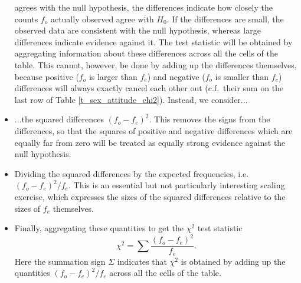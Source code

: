 \begin{itemize}
agrees with the null hypothesis, the differences indicate how closely
the counts $f_{o}$ actually observed agree with $H_{0}$. If the
differences are small, the observed data are consistent with the null
hypothesis, whereas large differences indicate evidence against it.
The test statistic will be obtained by aggregating information about these
differences across all the cells of the table. This cannot, however, be
done by adding up the differences themselves, because positive
($f_{o}$ is larger than $f_{e}$)
and negative
($f_{o}$ is smaller than $f_{e}$) differences
will always exactly cancel each other
out (c.f.\ their sum on the last row of Table \ref{t_sex_attitude_chi2}). Instead, we
consider...
\item
...the squared differences $(f_{o}-f_{e})^{2}$. This
removes the signs from the differences, so that the squares of
positive and negative differences which are equally far from zero will
be treated as equally strong evidence against the null hypothesis.
\item
Dividing the squared differences by the expected frequencies, i.e.\
$(f_{o}-f_{e})^{2}/f_{e}$. This is an essential but not particularly
interesting scaling exercise, which expresses the sizes of the squared
differences relative to the sizes of $f_{e}$ themselves.
\item
Finally, aggregating these quantities
to get the $\chi^{2}$ test statistic
\begin{equation}
\chi^{2} = \sum \frac{(f_{o}-f_{e})^{2}}{f_{e}}.
\label{chi2}
\end{equation}
Here the summation sign $\Sigma$ indicates that $\chi^{2}$ is obtained
by adding up the quantities $(f_{o}-f_{e})^{2}/f_{e}$ across all the cells of
the table.
\end{itemize}

